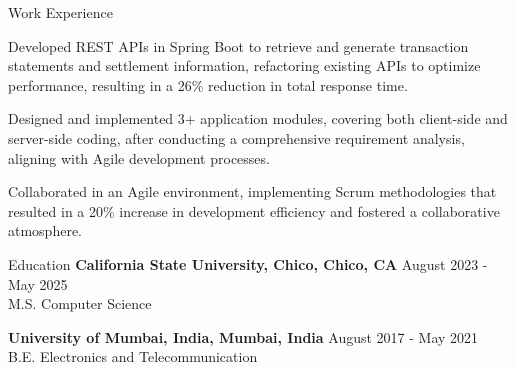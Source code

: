 \documentclass{resume} %
\begin{document}
\begin{rSection}{Work Experience}
\begin{rSubsection}
                                    {}
                                {}
                                    \item Developed REST APIs in Spring Boot to retrieve and generate transaction statements and settlement information, refactoring existing APIs to optimize performance, resulting in a 26\% reduction in total response time.
                                    \item Designed and implemented 3+ application modules, covering both client{-}side and server{-}side coding, after conducting a comprehensive requirement analysis, aligning with Agile development processes.
                                    \item Collaborated in an Agile environment, implementing Scrum methodologies that resulted in a 20\% increase in development efficiency and fostered a collaborative atmosphere.
                            \end{rSubsection}
            \end{rSection}

\begin{rSection}{Education}
                        \textbf{California State University, Chico, Chico, CA} \hfill {August 2023 - May 2025} \\
                            {M.S. Computer Science}
                         
             
         
                        \textbf{University of Mumbai, India, Mumbai, India} \hfill {August 2017 - May 2021} \\
                            {B.E. Electronics and Telecommunication}
                         
             
         
    \end{rSection}
\end{document}
